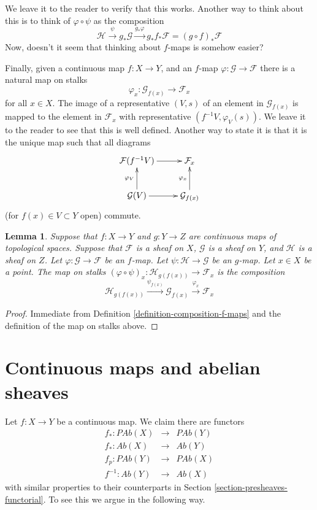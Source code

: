 \documentclass{stacks-project}
\theoremstyle{plain}
\newtheorem{lemma}[subsection]{Lemma}
\theoremstyle{definition}
\theoremstyle{remark}
\numberwithin{equation}{subsection}
\begin{document}
\noindent
We leave it to the reader to verify that this works.
Another way to think about this is to think of
$\varphi \circ \psi$ as the composition
$$
\mathcal{H}
\xrightarrow{\psi}
g_*\mathcal{G}
\xrightarrow{g_*\varphi}
g_* f_* \mathcal{F} = (g \circ f)_* \mathcal{F}
$$
Now, doesn't it seem that thinking about $f$-maps is somehow
easier?

\medskip\noindent
Finally, given a continuous map $f : X \to Y$, and an
$f$-map $\varphi : \mathcal{G} \to \mathcal{F}$ there is
a natural map on stalks
$$
\varphi_x : \mathcal{G}_{f(x)} \longrightarrow \mathcal{F}_x
$$
for all $x \in X$. The image of a representative $(V, s)$
of an element in $\mathcal{G}_{f(x)}$ is mapped to the
element in $\mathcal{F}_x$ with representative $(f^{-1}V,
\varphi_V(s))$. We leave it to the reader to see that this
is well defined. Another way to state it is that it is the
unique map such that all diagrams
$$
\xymatrix{
\mathcal{F}(f^{-1}V) \ar[r] &
\mathcal{F}_x \\
\mathcal{G}(V) \ar[r] \ar[u]^{\varphi_V} &
\mathcal{G}_{f(x)} \ar[u]^{\varphi_x}
}
$$
(for $f(x) \in V \subset Y$ open) commute.

\begin{lemma}
\label{lemma-compose-f-maps-stalks}
Suppose that $f : X \to Y$ and $g : Y \to Z$ are continuous
maps of topological spaces. Suppose that $\mathcal{F}$ is
a sheaf on $X$, $\mathcal{G}$ is a sheaf on $Y$, and
$\mathcal{H}$ is a sheaf on $Z$.
Let $\varphi : \mathcal{G} \to \mathcal{F}$ be an $f$-map.
Let $\psi : \mathcal{H} \to \mathcal{G}$ be an $g$-map.
Let $x \in X$ be a point. The map on stalks
$(\varphi \circ \psi)_x : \mathcal{H}_{g(f(x))}
\to \mathcal{F}_x$ is the composition
$$
\mathcal{H}_{g(f(x))}
\xrightarrow{\psi_{f(x)}}
\mathcal{G}_{f(x)}
\xrightarrow{\varphi_x}
\mathcal{F}_x
$$
\end{lemma}

\begin{proof}
Immediate from Definition \ref{definition-composition-f-maps}
and the definition of the map on stalks above.
\end{proof}



\section{Continuous maps and abelian sheaves}
\label{section-abelian-presheaves-functorial}

\noindent
Let $f : X \to Y$ be a continuous map.
We claim there are functors
\begin{eqnarray*}
f_* : \textit{PAb}(X) & \longrightarrow & \textit{PAb}(Y) \\
f_* : \textit{Ab}(X) & \longrightarrow & \textit{Ab}(Y) \\
f_p : \textit{PAb}(Y) & \longrightarrow & \textit{PAb}(X) \\
f^{-1} : \textit{Ab}(Y) & \longrightarrow & \textit{Ab}(X)
\end{eqnarray*}
with similar properties to their counterparts in
Section \ref{section-presheaves-functorial}.
To see this we argue in the following way.
\end{document}
